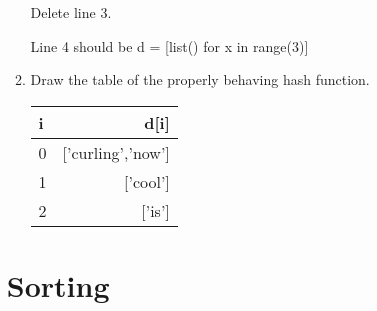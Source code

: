 \documentclass[11pt]{article}
\newenvironment{answer}{\large\lstset{basicstyle=\large}\color{white}}{}
\newenvironment{answer}{\large\lstset{basicstyle=\large}\color{red}}{}
\begin{document}
\begin{enumerate}
\begin{enumerate}
        \begin{answer}
        Delete line 3.

        Line 4 should be d = [list() for x in range(3)]
        \end{answer}

    \item Draw the table of the properly behaving hash function.
        
        \begin{answer}
            \begin{tabular}{l | r}
    
        	i & d[i] \\ \hline
            0 & ['curling','now'] \\ 
            1 & ['cool'] \\
            2 & ['is'] \\
    
    	    \end{tabular}
        \end{answer}
    \end{enumerate}


\section*{Sorting}


\end{enumerate}
\end{document}
